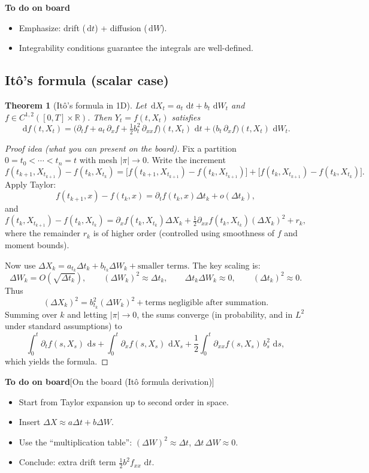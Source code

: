 \documentclass[11pt]{article}
\newcommand{\R}{\mathbb{R}}
\newcommand{\1}{\mathbf{1}}
\newcommand{\dd}{\,\mathrm{d}}
\numberwithin{equation}{section}
\theoremstyle{plain}
\newtheorem{theorem}{Theorem}[section]
\theoremstyle{definition}
\theoremstyle{remark}
\begin{document}
\textbf{To do on board}
\begin{itemize}[leftmargin=2em]
  \item Emphasize: drift ($\dd t$) + diffusion ($\dd W$).
  \item Integrability conditions guarantee the integrals are well-defined.
\end{itemize}


\subsection{It\^o's formula (scalar case)}

\begin{theorem}[It\^o's formula in 1D]
Let $\dd X_t=a_t\,\dd t+b_t\,\dd W_t$ and $f\in C^{1,2}([0,T]\times\R)$.
Then $Y_t=f(t,X_t)$ satisfies
\[
\dd f(t,X_t)
=\Big(\partial_t f + a_t\,\partial_x f + \tfrac12 b_t^2\,\partial_{xx} f\Big)(t,X_t)\,\dd t
+\big(b_t\,\partial_x f\big)(t,X_t)\,\dd W_t.
\]
\end{theorem}

\begin{proof}[Proof idea (what you can present on the board)]
Fix a partition $0=t_0<\cdots<t_n=t$ with mesh $|\pi|\to 0$.
Write the increment
\[
f(t_{k+1},X_{t_{k+1}})-f(t_k,X_{t_k})
=
\Big[f(t_{k+1},X_{t_{k+1}})-f(t_k,X_{t_{k+1}})\Big]
+
\Big[f(t_k,X_{t_{k+1}})-f(t_k,X_{t_k})\Big].
\]
Apply Taylor:
\[
f(t_{k+1},x)-f(t_k,x)=\partial_t f(t_k,x)\Delta t_k + o(\Delta t_k),
\]
and
\[
f(t_k,X_{t_{k+1}})-f(t_k,X_{t_k})
=\partial_x f(t_k,X_{t_k})\Delta X_k + \tfrac12 \partial_{xx} f(t_k,X_{t_k})(\Delta X_k)^2 + r_k,
\]
where the remainder $r_k$ is of higher order (controlled using smoothness of $f$ and moment bounds).

Now use $\Delta X_k = a_{t_k}\Delta t_k + b_{t_k}\Delta W_k + \text{smaller terms}$.
The key scaling is:
\[
\Delta W_k = O(\sqrt{\Delta t_k}),
\qquad
(\Delta W_k)^2 \approx \Delta t_k,
\qquad
\Delta t_k\Delta W_k \approx 0,
\qquad
(\Delta t_k)^2 \approx 0.
\]
Thus
\[
(\Delta X_k)^2 = b_{t_k}^2(\Delta W_k)^2 + \text{terms negligible after summation}.
\]
Summing over $k$ and letting $|\pi|\to 0$, the sums converge (in probability, and in $L^2$ under standard assumptions) to
\[
\int_0^t \partial_t f(s,X_s)\,\dd s
+\int_0^t \partial_x f(s,X_s)\,\dd X_s
+\frac12\int_0^t \partial_{xx} f(s,X_s)\,b_s^2\,\dd s,
\]
which yields the formula.
\end{proof}

\textbf{To do on board}[On the board (It\^o formula derivation)]
\begin{itemize}[leftmargin=2em]
  \item Start from Taylor expansion up to second order in space.
  \item Insert $\Delta X \approx a\Delta t + b\Delta W$.
  \item Use the “multiplication table”: $(\Delta W)^2\approx \Delta t$, $\Delta t\,\Delta W\approx 0$.
  \item Conclude: extra drift term $\tfrac12 b^2 f_{xx}\,\dd t$.
\end{itemize}
\end{document}
